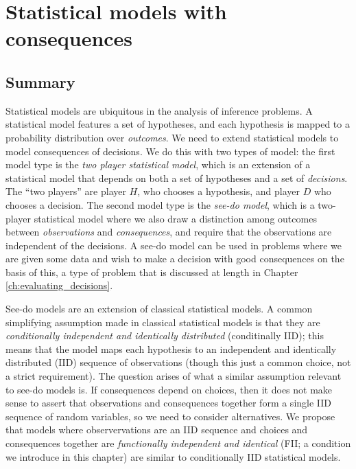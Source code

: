 

\chapter{Statistical models with consequences}\label{ch:2p_statmodels}


\section{Summary}

Statistical models are ubiquitous in the analysis of inference problems. A statistical model features a set of hypotheses, and each hypothesis is mapped to a probability distribution over \emph{outcomes}. We need to extend statistical models to model consequences of decisions. We do this with two types of model: the first model type is the \emph{two player statistical model}, which is an extension of a statistical model that depends on both a set of hypotheses and a set of \emph{decisions}. The ``two players'' are player $H$, who chooses a hypothesis, and player $D$ who chooses a decision. The second model type is the \emph{see-do model}, which is a two-player statistical model where we also draw a distinction among outcomes between \emph{observations} and \emph{consequences}, and require that the observations are independent of the decisions. A see-do model can be used in problems where we are given some data and wish to make a decision with good consequences on the basis of this, a type of problem that is discussed at length in Chapter \ref{ch:evaluating_decisions}.

See-do models are an extension of classical statistical models. A common simplifying assumption made in classical statistical models is that they are \emph{conditionally independent and identically distributed} (conditinally IID); this means that the model maps each hypothesis to an independent and identically distributed (IID) sequence of observations (though this just a common choice, not a strict requirement). The question arises of what a similar assumption relevant to see-do models is. If consequences depend on choices, then it does not make sense to assert that observations and consequences together form a single IID sequence of random variables, so we need to consider alternatives. We propose that models where observervations are an IID sequence and choices and consequences together are \emph{functionally independent and identical} (FII; a condition we introduce in this chapter) are similar to conditionally IID statistical models. 

